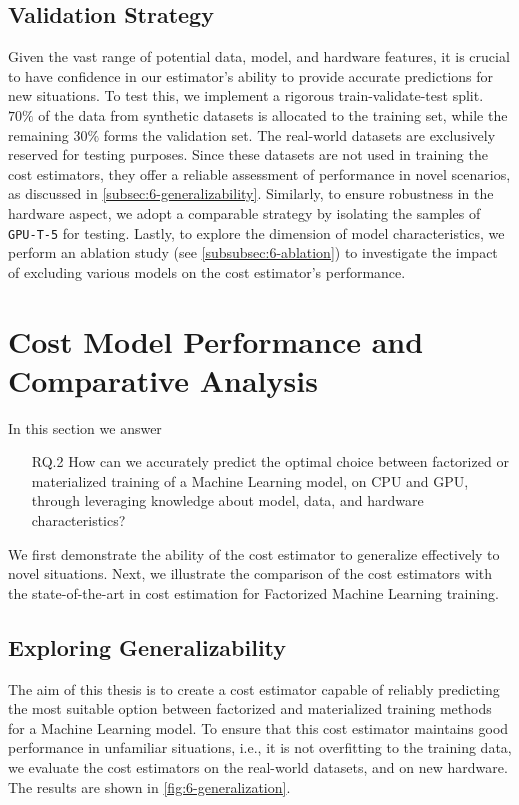 \subsection{Validation Strategy}
\label{subsec:6-validation-strategy}
Given the vast range of potential data, model, and hardware features, it is crucial to have confidence in our estimator's ability to provide accurate predictions for new situations. To test this, we implement a rigorous train-validate-test split. $70\%$ of the data from synthetic datasets is allocated to the training set, while the remaining $30\%$ forms the validation set. The real-world datasets are exclusively reserved for testing purposes. Since these datasets are not used in training the cost estimators, they offer a reliable assessment of performance in novel scenarios, as discussed in \autoref{subsec:6-generalizability}. Similarly, to ensure robustness in the hardware aspect, we adopt a comparable strategy by isolating the samples of \texttt{GPU-T-5} for testing. Lastly, to explore the dimension of model characteristics, we perform an ablation study (see \autoref{subsubsec:6-ablation}) to investigate the impact of excluding various models on the cost estimator's performance.

\section{Cost Model Performance and Comparative Analysis}
\label{sec:eval-model-evaluation}

In this section we answer
\begin{itemize}
    \item[RQ.2] How can we accurately predict the optimal choice between factorized or materialized training of a Machine Learning model, on CPU and GPU, through leveraging knowledge about model, data, and hardware characteristics?
\end{itemize}

We first demonstrate the ability of the cost estimator to generalize effectively to novel situations. Next, we illustrate the comparison of the cost estimators with the state-of-the-art in cost estimation for Factorized Machine Learning training.

\subsection{Exploring Generalizability}
\label{subsec:6-generalizability}
The aim of this thesis is to create a cost estimator capable of reliably predicting the most suitable option between factorized and materialized training methods for a Machine Learning model. To ensure that this cost estimator maintains good performance in unfamiliar situations, i.e., it is not overfitting to the training data, we evaluate the cost estimators on the real-world datasets, and on new hardware. The results are shown in \autoref{fig:6-generalization}.

